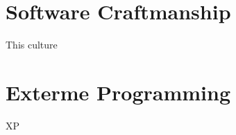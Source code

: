 \section{Software Craftmanship}\label{sec:software-craftmanship}
This culture
\section{Exterme Programming}\label{sec:exterme-programming}
XP
